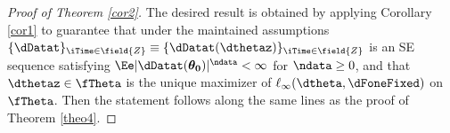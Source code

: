 

\proofskip
\begin{proof}[Proof of Theorem \ref{cor2}]
The desired result is obtained by applying Corollary \ref{cor1} to guarantee that under the maintained assumptions $\{\dDatat\}_{\iTime \in \field{Z}} \equiv \{\dDatat(\dthetaz)\}_{\iTime \in \field{Z}}$ is an SE sequence satisfying $\Ee|\dDatat(\boldsymbol{\theta_{0}})|^{\ndata}<\infty$ for $\ndata\geq 0$, and that $\dthetaz \in \fTheta$ is the unique maximizer of $\ell_{\infty}(\dtheta,\dFoneFixed)$ on $\fTheta$. Then the statement follows along the same lines as the proof of Theorem \ref{theo4}.
\end{proof}




%

%

